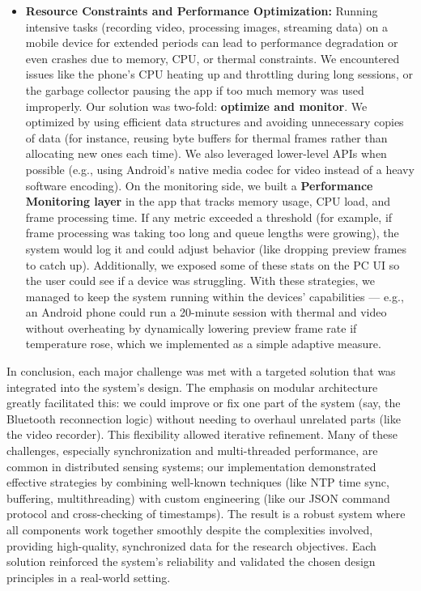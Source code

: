 \documentclass[11pt,a4paper]{report}
\begin{document}
\begin{itemize}
\item \textbf{Resource Constraints and Performance Optimization:} Running
  intensive tasks (recording video, processing images, streaming data)
  on a mobile device for extended periods can lead to performance
  degradation or even crashes due to memory, CPU, or thermal
  constraints. We encountered issues like the phone's CPU heating up and
  throttling during long sessions, or the garbage collector pausing the
  app if too much memory was used improperly. Our solution was two-fold:
  \textbf{optimize and monitor}. We optimized by using efficient data
  structures and avoiding unnecessary copies of data (for instance,
  reusing byte buffers for thermal frames rather than allocating new
  ones each time). We also leveraged lower-level APIs when possible
  (e.g., using Android's native media codec for video instead of a heavy
  software encoding). On the monitoring side, we built a \textbf{Performance
  Monitoring layer} in the app that tracks memory usage, CPU load, and
  frame processing
  time\cite{DeviceServer}.
  If any metric exceeded a threshold (for example, if frame processing
  was taking too long and queue lengths were growing), the system would
  log it and could adjust behavior (like dropping preview frames to
  catch up). Additionally, we exposed some of these stats on the PC UI
  so the user could see if a device was struggling. With these
  strategies, we managed to keep the system running within the devices'
  capabilities --- e.g., an Android phone could run a 20-minute session
  with thermal and video without overheating by dynamically lowering
  preview frame rate if temperature rose, which we implemented as a
  simple adaptive measure.

\end{itemize}
In conclusion, each major challenge was met with a targeted solution
that was integrated into the system's design. The emphasis on modular
architecture greatly facilitated this: we could improve or fix one part
of the system (say, the Bluetooth reconnection logic) without needing to
overhaul unrelated parts (like the video recorder). This flexibility
allowed iterative refinement. Many of these challenges, especially
synchronization and multi-threaded performance, are common in
distributed sensing systems; our implementation demonstrated effective
strategies by combining well-known techniques (like NTP time sync,
buffering, multithreading) with custom engineering (like our JSON
command protocol and cross-checking of timestamps). The result is a
robust system where all components work together smoothly despite the
complexities involved, providing high-quality, synchronized data for the
research objectives. Each solution reinforced the system's reliability
and validated the chosen design principles in a real-world setting.



\end{document}
